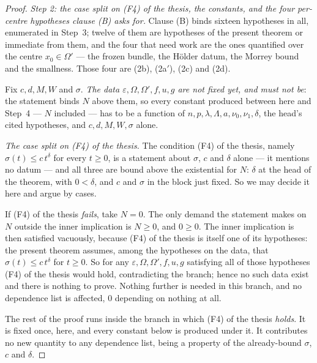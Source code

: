 \begin{proof}
\emph{Step 2: the case split on (F4) of the thesis, the constants, and the four
per-centre hypotheses clause \textup{(B)} asks for.}  Clause (B) binds sixteen
hypotheses in all, enumerated in Step~3; twelve of them are hypotheses of the
present theorem or immediate from them, and the four that need work are the ones
quantified over the centre $x_0\in\Omega'$ --- the frozen bundle, the H\"older
datum, the Morrey bound and the smallness.  Those four are (2b), (2a$'$), (2c)
and (2d).

Fix $c,d,M,W$ and $\sigma$.  \emph{The data
$\varepsilon,\Omega,\Omega',f,u,g$ are not fixed yet, and must not be}: the
statement binds $N$ above them, so every constant produced between here and
Step~4 --- $N$ included --- has to be a function of
$n,p,\lambda,\Lambda,a,\nu_0,\nu_1,\delta$, the head's cited hypotheses, and
$c,d,M,W,\sigma$ alone.

\emph{The case split on (F4) of the thesis.}  The condition (F4) of the thesis, namely
$\sigma(t)\le c\,t^{\delta}$ for every $t\ge0$, is a statement about $\sigma$,
$c$ and $\delta$ alone --- it mentions no datum --- and all three are bound
above the existential for $N$: $\delta$ at the head of the theorem, with
$0<\delta$, and $c$ and $\sigma$ in the block just fixed.  So we may decide it
here and argue by cases.

If (F4) of the thesis \emph{fails}, take $N=0$.  The only demand the statement makes
on $N$ outside the inner implication is $N\ge0$, and $0\ge0$.  The inner
implication is then satisfied vacuously, because (F4) of the thesis is itself one of
its hypotheses: the present theorem assumes, among the hypotheses on the data,
that $\sigma(t)\le c\,t^{\delta}$ for $t\ge0$.  So for any
$\varepsilon,\Omega,\Omega',f,u,g$ satisfying all of those hypotheses
(F4) of the thesis would hold, contradicting the branch; hence no such data exist and
there is nothing to prove.  Nothing further is needed in this branch, and no
dependence list is affected, $0$ depending on nothing at all.

The rest of the proof runs inside the branch in which (F4) of the thesis
\emph{holds}.  It is fixed once, here, and every constant below is produced
under it.  It contributes no new quantity to any dependence list, being a
property of the already-bound $\sigma$, $c$ and $\delta$.


\end{proof}
